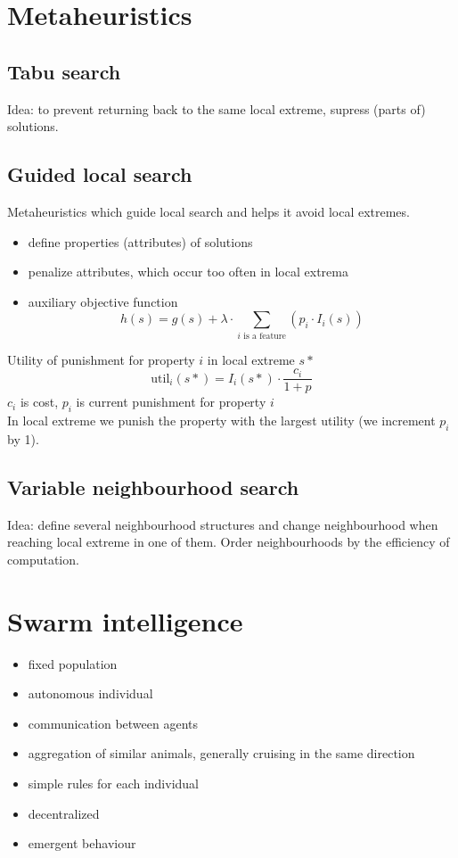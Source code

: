 \begin{multicols}{5}
\section{Metaheuristics}
\subsection{Tabu search}
Idea: to prevent returning back to the same local extreme, supress (parts of) solutions.
\subsection{Guided local search}
Metaheuristics which guide local search and helps it avoid local extremes.
\begin{itemize}
	\item define properties (attributes) of solutions
	\item penalize attributes, which occur too often in local extrema
	\item auxiliary objective function
		\[h(s) = g(s) + \lambda \cdot \sum_{i\text{ is a feature}}(p_i\cdot I_i(s))\]
\end{itemize}
Utility of punishment for property $i$ in local extreme $s*$
\[
	\text{util}_i(s*) = I_i(s*) \cdot \frac{c_i}{1+p}
\]
$c_i$ is cost, $p_i$ is current punishment for property $i$ \\
In local extreme we punish the property with the largest utility (we increment $p_i$ by 1).
\subsection{Variable neighbourhood search}
Idea: define several neighbourhood structures and change neighbourhood when reaching local extreme
in one of them. Order neighbourhoods by the efficiency of computation.

\section{Swarm intelligence}
\begin{itemize}
	\item fixed population
	\item autonomous individual
	\item communication between agents
	\item aggregation of similar animals, generally cruising in the same direction
	\item simple rules for each individual
	\item decentralized
	\item emergent behaviour
\end{itemize}

\end{multicols}
